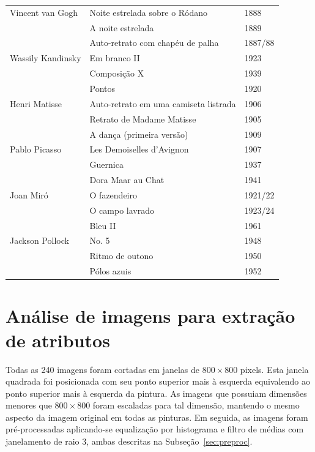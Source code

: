 \begin{table}
\begin{center}
\begin{tabular}{l|l|l}
Vincent van Gogh    & Noite estrelada sobre o Ródano & 1888 \\
                    & A noite estrelada & 1889 \\
                    & Auto-retrato com chapéu de palha & 1887/88 \\

Wassily Kandinsky   & Em branco II & 1923 \\
                    & Composição X & 1939 \\
                    & Pontos & 1920 \\

Henri Matisse       & Auto-retrato em uma camiseta listrada & 1906 \\
                    & Retrato de Madame Matisse & 1905 \\
                    & A dança (primeira versão) & 1909 \\

Pablo Picasso       & Les Demoiselles d'Avignon & 1907 \\
                    & Guernica & 1937 \\
                    & Dora Maar au Chat & 1941 \\

Joan Mir\'{o}       & O fazendeiro & 1921/22 \\
                    & O campo lavrado & 1923/24 \\
                    & Bleu II & 1961 \\

Jackson Pollock     & No. 5 & 1948 \\
                    & Ritmo de outono & 1950 \\
                    & Pólos azuis & 1952 \\

\hline
\end{tabular}
\end{center}
\end{table}


\section{Análise de imagens para extração de atributos}

Todas as 240 imagens foram cortadas em janelas de $800\times800$
pixels. Esta janela quadrada foi posicionada com seu ponto superior
mais à esquerda equivalendo ao ponto superior mais à esquerda da
pintura. As imagens que possuiam dimensões menores que $800\times800$
foram escaladas para tal dimensão, mantendo o mesmo aspecto da imagem
original em todas as pinturas. Em seguida, as imagens foram
pré-processadas aplicando-se equalização por histograma e filtro de
médias com janelamento de raio 3, ambas descritas na
Subseção~\ref{sec:preproc}.

